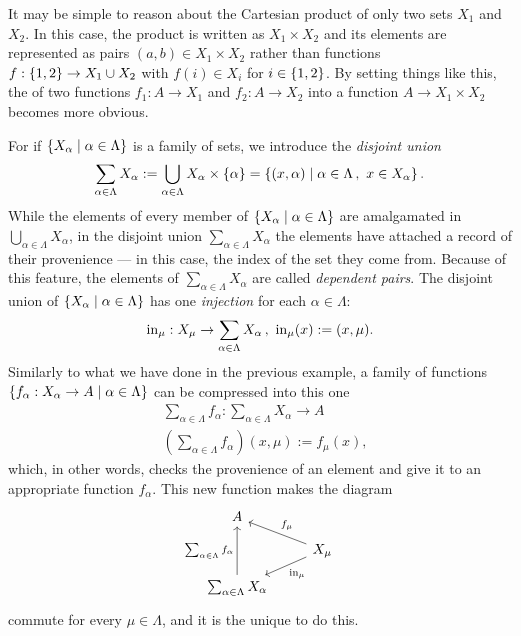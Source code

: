 \begin{exercise}
It may be simple to reason about the Cartesian product of only two sets \(X_1\) and \(X_2\). In this case, the product is written as \(X_1 \times X_2\) and its elements are represented as pairs \((a, b) \in X_1 \times X_2\) rather than functions \(f : \left\{1, 2\right\} \to X_1 \cup X_2\) with \(f(i) \in X_i\) for \(i \in \left\{1, 2\right\}\). By setting things like this, the  of two functions \(f_1 : A \to X_1\) and \(f_2 : A \to X_2\) into a function \(A \to X_1 \times X_2\) becomes more obvious.
\end{exercise}

\begin{example}\label{example:CoprodOfSets}
For if \(\left\{X_\alpha \mid \alpha \in \Lambda\right\}\) is a family of sets, we introduce the {\em disjoint union}
\[\sum_{\alpha \in \Lambda} X_\alpha := \bigcup_{\alpha \in \Lambda} X_\alpha \times \left\{\alpha\right\} = \left\{(x, \alpha) \mid \alpha \in \Lambda\,, \ x \in X_\alpha\right\} .\]
While the elements of every member of \(\left\{X_\alpha \mid \alpha \in \Lambda\right\}\) are amalgamated in \(\bigcup_{\alpha \in \Lambda} X_\alpha\), in the disjoint union \(\sum_{\alpha \in \Lambda} X_\alpha\) the elements have attached a record of their provenience --- in this case, the index of the set they come from. Because of this feature, the elements of \(\sum_{\alpha \in \Lambda} X_\alpha\) are called {\em dependent pairs}. The disjoint union of \(\left\{X_\alpha \mid \alpha \in \Lambda\right\}\) has one {\em injection} for each \(\alpha \in \Lambda\):
\[\operatorname{in}_\mu : X_\mu \to \sum_{\alpha \in \Lambda} X_\alpha\,, \ \operatorname{in}_\mu(x) := (x, \mu) .\]
Similarly to what we have done in the previous example, a family of functions \(\left\{f_\alpha : X_\alpha \to A \mid \alpha \in \Lambda\right\}\) can be compressed into this one
\begin{align*}
& \sum_{\alpha \in \Lambda} f_\alpha : \sum_{\alpha \in \Lambda} X_\alpha \to A \\
& \left(\sum_{\alpha \in \Lambda} f_\alpha\right) (x, \mu) := f_\mu(x) ,
\end{align*}
which, in other words, checks the provenience of an element and give it to an appropriate function \(f_\alpha\). This new function makes the diagram
\[\begin{tikzcd}[row sep=small]
A \\
& X_\mu \ar["{\inj_\mu}", dl] \ar["{f_\mu}", ul, swap] \\
\sum_{\alpha \in \Lambda} X_\alpha \ar["{\sum_{\alpha \in \Lambda} f_\alpha}", uu]
\end{tikzcd}\]
commute for every \(\mu \in \Lambda\), and it is the unique to do this.%
\end{example}

